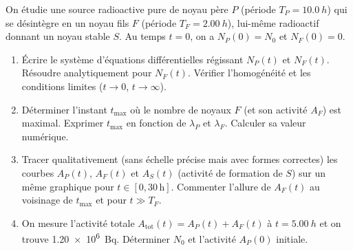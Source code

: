 \documentclass[11pt]{article}
\begin{document}
\begin{exercice}
On étudie une source radioactive pure de noyau père $P$ (période $T_P = \SI{10,0}{h}$) qui se désintègre en un noyau fils $F$ (période $T_F = \SI{2,00}{h}$), lui-même radioactif donnant un noyau stable $S$. Au temps $t=0$, on a $N_P(0) = N_0$ et $N_F(0) = 0$.
\begin{enumerate}
    \item Écrire le système d'équations différentielles régissant $N_P(t)$ et $N_F(t)$. Résoudre analytiquement pour $N_F(t)$. Vérifier l'homogénéité et les conditions limites ($t\to0$, $t\to\infty$).
    \item Déterminer l'instant $t_{\text{max}}$ où le nombre de noyaux $F$ (et son activité $A_F$) est maximal. Exprimer $t_{\text{max}}$ en fonction de $\lambda_P$ et $\lambda_F$. Calculer sa valeur numérique.
    \item Tracer qualitativement (sans échelle précise mais avec formes correctes) les courbes $A_P(t)$, $A_F(t)$ et $A_S(t)$ (activité de formation de $S$) sur un même graphique pour $t \in [0, 30\,\text{h}]$. Commenter l'allure de $A_F(t)$ au voisinage de $t_{\text{max}}$ et pour $t \gg T_F$.
    \item On mesure l'activité totale $A_{\text{tot}}(t) = A_P(t) + A_F(t)$ à $t = \SI{5,00}{h}$ et on trouve \SI{1,20e6}{Bq}. Déterminer $N_0$ et l'activité $A_P(0)$ initiale.
\end{enumerate}
\end{exercice}
\end{document}
